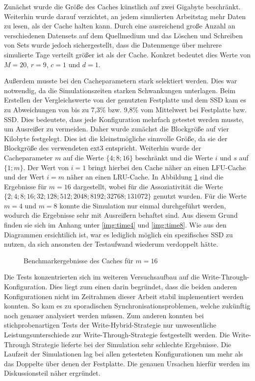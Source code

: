 Zunächst wurde die Größe des Caches künstlich auf zwei Gigabyte beschränkt. Weiterhin wurde darauf verzichtet, an jedem simulierten Arbeitstag mehr Daten zu
lesen, als der Cache halten kann. Durch eine ausreichend große Anzahl an verschiedenen Datensets auf dem Quellmedium und das Löschen und Schreiben von Sets wurde
jedoch sichergestellt, dass die Datenmenge über mehrere simulierte Tage verteilt größer ist als der Cache. Konkret bedeutet dies Werte von $M=20$, $r=9$, $c=1$
und $d=1$.

Außerdem musste bei den Cacheparametern stark selektiert werden. Dies war notwendig, da die Simulationszeiten starken Schwankungen unterlagen. Beim Erstellen
der Vergleichswerte von der genutzten Festplatte und dem \ac{SSD} kam es zu Abweichungen von bis zu 7,3\% bzw. 9,8\% vom Mittelwert bei Festplatte bzw.
\ac{SSD}. Dies bedeutete, dass jede Konfiguration mehrfach getestet werden musste, um Ausreißer zu vermeiden. Daher wurde zunächst die Blockgröße auf vier
Kilobyte festgelegt. Dies ist die kleinstmögliche sinnvolle Größe, da sie der Blockgröße des verwendeten \ac{ext3} entspricht. Weiterhin wurde der Cacheparameter $m$ auf die Werte $\{4;8;16\}$
beschränkt und die Werte $i$ und $s$ auf $\{1;m\}$. Der Wert von $i=1$ bringt hierbei den Cache näher an einen LFU-Cache und der Wert $i=m$ näher an einen
LRU-Cache. In Abbildung \ref{img:time16} sind die Ergebnisse für $m=16$ dargestellt, wobei für die Assoziativität die Werte
$\{2;4;8;16;32;128;512;2048;8192;32768;131072\}$ genutzt wurden. Für die Werte $m=4$ und $m=8$ konnte die Simulation nur einmal durchgeführt werden, wodurch die
Ergebnisse sehr mit Ausreißern behaftet sind. Aus diesem Grund finden sie sich im Anhang unter \ref{img:time4} und \ref{img:time8}. Wie aus den Diagrammen 
ersichtilich ist, war es lediglich möglich ein spezifisches \ac{SSD} zu nutzen, da sich ansonsten der Testaufwand wiederum verdoppelt hätte.

\begin{figure}[b!]\centering
    \caption{Benchmarkergebnisse des Caches für $m=16$}
    \label{img:time16}
\end{figure}

Die Tests konzentrierten sich im weiteren Versuchsaufbau auf die Write-Through-Kon\-fi\-gu\-ra\-tion. Dies liegt zum einen darin begründet, dass die beiden anderen
Konfigurationen nicht im Zeitrahmen dieser Arbeit stabil implementiert werden konnten. So kam es zu sporadischen Synchronisationsproblemen, welche zukünftig noch genauer
analysiert werden müssen. Zum anderen konnten bei stichprobenartigen Tests der Write-Hybrid-Strategie nur unwesentliche Leistungsunterschiede zur
Write-Through-Strategie festgestellt werden. Die Write-Through Strategie lieferte bei der Simulation sehr schlechte Ergebnisse. Die Laufzeit der Simulationen lag
bei allen getesteten Konfigurationen um mehr als das Doppelte über denen der Festplatte. Die genauen Ursachen hierfür werden im Diskussionsteil näher ergründet.

